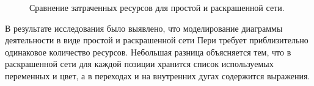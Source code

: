 \begin{figure}
	\centering
	\caption{Сравнение затраченных ресурсов для простой и раскрашенной сети.}
	\label{fig:fig30}
\end{figure}

В результате исследования было выявлено, что моделирование диаграммы деятельности в виде простой и раскрашенной сети Пери требует приблизительно одинаковое количество ресурсов. Небольшая разница объясняется тем, что в раскрашенной сети для каждой позиции хранится список используемых переменных и цвет, а в переходах и на внутренних дугах содержится выражения.

\label{cha:research}

